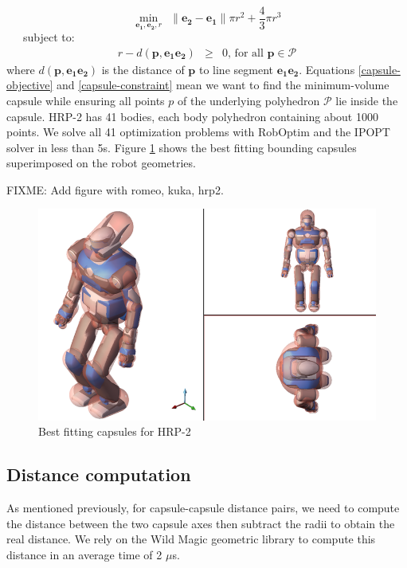 \begin{equation}
  \min_{\mathbf{e_1}, \mathbf{e_2}, r} \ \ 
  \|\mathbf{e_2} - \mathbf{e_1}\| \pi r^2 + \frac{4}{3}\pi r^3
  \label{capsule-objective}
\end{equation}
\ \ \ subject to:
\begin{equation}
  \begin{array}{rcll}
    r - d(\mathbf{p},\mathbf{e_1e_2}) & \ge & 0\mbox{, for all }
    \mathbf{p} \in \mathcal{P}
    \label{capsule-constraint}
  \end{array}
\end{equation} 
where $d(\mathbf{p},\mathbf{e_1e_2})$ is the distance of $\mathbf{p}$
to line segment $\mathbf{e_1e_2}$.  Equations \ref{capsule-objective}
and \ref{capsule-constraint} mean we want to find the minimum-volume
capsule while ensuring all points $p$ of the underlying polyhedron
$\mathcal{P}$ lie inside the capsule. HRP-2 has 41 bodies, each body
polyhedron containing about 1000 points. We solve all 41 optimization
problems with RobOptim \cite{roboptim, moulard2012optimisation} and
the IPOPT solver \cite{Biegler2009} in less than 5s. Figure
\ref{hrp2-capsule} shows the best fitting bounding capsules
superimposed on the robot geometries.

FIXME: Add figure with romeo, kuka, hrp2.

\begin{figure}
  \centering
  \includegraphics[width=0.9\linewidth]
                  {src/chap3-optimal-motion-planning/figure/hrp2-capsule-transparent.png}
  \caption{Best fitting capsules for HRP-2}
  \label{hrp2-capsule}
\end{figure}

\subsection{Distance computation}
As mentioned previously, for capsule-capsule distance pairs, we need
to compute the distance between the two capsule axes then subtract the
radii to obtain the real distance. We rely on the Wild Magic geometric
library \cite{schneider2003geometric, wildmagic} to compute this
distance in an average time of 2 $\mu$s.

